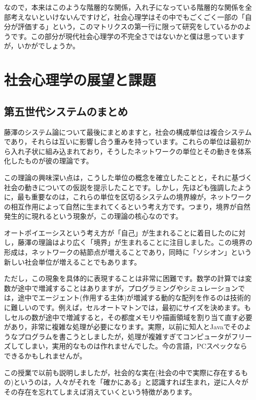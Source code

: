 \documentclass{ltjsbook}
\begin{document}
なので，本来はこのような階層的な関係，入れ子になっている階層的な関係を全部考えないといけないんですけど，社会心理学はその中でもごくごく一部の「自分が評価する」という，このマトリクスの第一行に限って研究をしているかのようです。この部分が現代社会心理学の不完全さではないかと僕は思っていますが，いかがでしょうか。

\section{社会心理学の展望と課題}
\subsection{第五世代システムのまとめ}
藤澤のシステム論について最後にまとめますと，社会の構成単位は複合システムであり，それらは互いに影響し合う重みを持っています。これらの単位は最初から入れ子状に組み込まれており，そうしたネットワークの単位とその動きを体系化したものが彼の理論です。

この理論の興味深い点は，こうした単位の概念を確立したことと，それに基づく社会の動きについての仮説を提示したことです。しかし，先ほども強調したように，最も重要なのは，これらの単位を区切るシステムの境界線が，ネットワークの相互作用によって自然に生まれてくるという考え方です。つまり，境界が自然発生的に現れるという現象が，この理論の核心なのです。

オートポイエーシスという考え方が「自己」が生まれることに着目したのに対し，藤澤の理論はより広く「境界」が生まれることに注目しました。この境界の形成は，ネットワークの結節点が増えることであり，同時に「ソシオン」という新しい社会単位が増えることでもあります。

ただし，この現象を具体的に表現することは非常に困難です。数学の計算では変数が途中で増減することはありますが，プログラミングやシミュレーションでは，途中でエージェント(作用する主体)が増減する動的な配列を作るのは技術的に難しいのです。例えば，セルオートマトンでは，最初にサイズを決めます。もしセルの数が途中で増減すると，その都度メモリや描画領域を割り当て直す必要があり，非常に複雑な処理が必要になります。実際，以前に知人とJavaでそのようなプログラムを書こうとしましたが，処理が複雑すぎてコンピュータがフリーズしてしまい，実用的なものは作れませんでした。今の言語，PCスペックならできるかもしれませんが。

この授業で以前も説明しましたが，社会的な実在(社会の中で実際に存在するもの)というのは，人々がそれを「確かにある」と認識すれば生まれ，逆に人々がその存在を忘れてしまえば消えていくという特徴があります。
\end{document}
